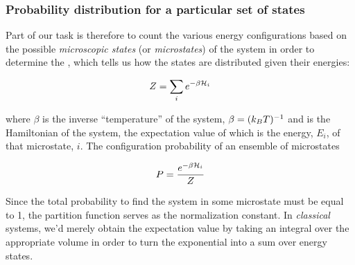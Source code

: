 \documentclass[hyperref={colorlinks=true}]{beamer}
\begin{document}

\begin{frame}%
  \frametitle{Probability distribution for a particular set of states}

  Part of our task is therefore to count the various energy configurations based on the possible \textit{microscopic states} (or \textit{microstates}) of the system in order to determine the , which tells us how the states are distributed given their energies:
  
  \begin{equation}
    Z = \sum_i e^{-\beta \mathcal{H}_i}
  \end{equation}

  where $\beta$ is the inverse ``temperature'' of the system, $\beta = (k_B T)^{-1}$ and \Ham is the Hamiltonian of the system, the expectation value of which is the energy, $E_i$, of that microstate, $i$. The configuration probability of an ensemble of microstates 
  
  \begin{equation}
    P = \frac{e^{-\beta \mathcal{H}_i}}{Z}
  \end{equation}

  Since the total probability to find the system in some microstate must be equal to 1, the partition function serves as the normalization constant. In \textit{classical} systems, we'd merely obtain the expectation value by taking an integral over the appropriate volume in order to turn the exponential into a sum over energy states.

\end{frame}
\end{document}
